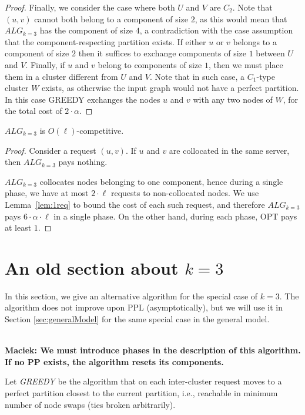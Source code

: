 \documentclass[manuscript,screen=true]{acmart}
\newcommand{\TAlg}{{\ensuremath{ALG_{k=3}}}\xspace} %
\newcommand\maciek[1]{\color{brown}\textbf{\\ Maciek: #1}\color{black}}
\begin{document}
\begin{appendix}
\begin{proof}
      Finally, we consider the case where both $U$ and $V$ are $C_2$. Note that $(u,v)$ cannot both belong to a component of size $2$, as this would mean that \TAlg has the component of size $4$, a contradiction with the case assumption that the component-respecting partition exists. 
      If either $u$ or $v$ belongs to a component of size $2$ then it suffices to exchange components of size $1$ between $U$ and $V$.
      Finally, if $u$ and $v$ belong to components of size $1$, then we must place them in a cluster different from $U$ and $V$.
      Note that in such case, a $C_1$-type cluster $W$ exists, as otherwise the input graph would not have a perfect partition. In this case GREEDY exchanges the nodes $u$ and $v$ with any two nodes of $W$, for the total cost of $2\cdot \alpha$.
  \end{proof}
  
  
  \begin{theorem}
    \TAlg is $O(\ell)$-competitive.
  \end{theorem}
  \begin{proof}
    Consider a request $(u,v)$.
    If $u$ and $v$ are collocated in the same server, then \TAlg pays nothing.
  
    \TAlg collocates nodes belonging to one component, hence during a single phase, we have at most $2\cdot \ell$ requests to non-collocated nodes.
    We use Lemma~\ref{lem:1req} to bound the cost of each such request, and therefore \TAlg pays $6\cdot\alpha\cdot \ell$ in a single phase.
    On the other hand, during each phase, OPT pays at least $1$.
  \end{proof}
  

  \section{An old section about $k=3$}

  \label{sec:k3}
  In this section,
  we give an alternative algorithm for the special case of $k=3$.
  The algorithm does not  improve upon PPL (asymptotically),
  but we will use it in Section \ref{sec:generalModel} for the same special case in the general model.
  
  \maciek{We must introduce phases in the description of this algorithm. If no PP exists, the algorithm resets its components.}
  
  Let \emph{GREEDY} be the algorithm that on each inter-cluster request
   moves to a perfect partition
  closest to the current partition,
  i.e.,
  reachable in minimum number of node swaps (ties broken arbitrarily).
  

\end{appendix}
\end{document}
